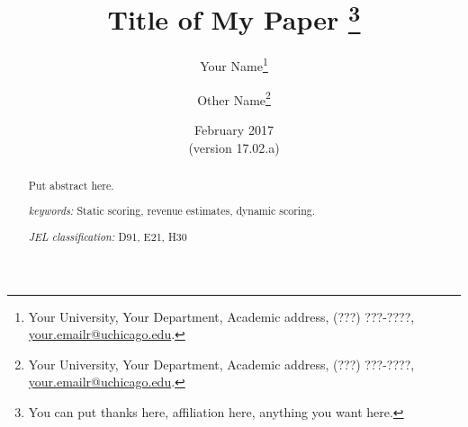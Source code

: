 \documentclass[letterpaper,12pt]{article}
\theoremstyle{definition}
\begin{document}
\begin{titlepage}
\title{Title of My Paper \thanks{You can put thanks here, affiliation here, anything you want here.}
       }
       \author{
  Your Name\footnote{Your University, Your Department, Academic address, (???) ???-????, \href{mailto:your.emailr@uchicago.edu}{your.emailr@uchicago.edu}.} \\[-2pt]
  \and
  Other Name\footnote{Your University, Your Department, Academic address, (???) ???-????, \href{mailto:your.emailr@uchicago.edu}{your.emailr@uchicago.edu}.}}
\date{February 2017 \\
  \scriptsize{(version 17.02.a)}}
\maketitle
\vspace{-9mm}
\begin{abstract}
\small{Put abstract here.
\vspace{3mm}

\noindent\textit{keywords:}\: Static scoring, revenue estimates, dynamic scoring.

\vspace{3mm}

\noindent\textit{JEL classification:} D91, E21, H30
}

\end{abstract}
\thispagestyle{empty}
\end{titlepage}
\end{document}

